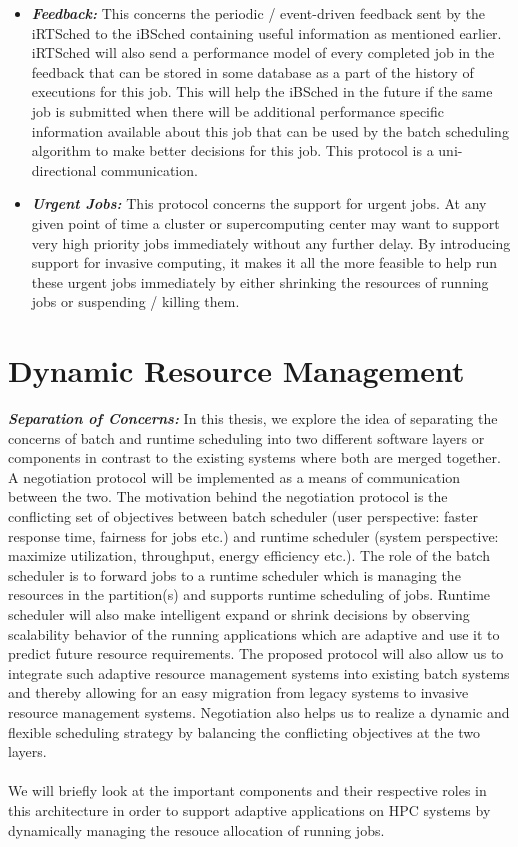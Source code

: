 \begin{itemize}
\item \textbf{\textit{Feedback:}} This concerns the periodic / event-driven feedback sent by the iRTSched to the iBSched containing useful information as mentioned earlier. iRTSched will also send a performance model of every completed job in the feedback that can be stored in some database as a part of the history of executions for this job. This will help the iBSched in the future if the same job is submitted when there will be additional performance specific information available about this job that can be used by the batch scheduling algorithm to make better decisions for this job. This protocol is a uni-directional communication.
\item \textbf{\textit{Urgent Jobs:}} This protocol concerns the support for urgent jobs. At any given point of time a cluster or supercomputing center may want to support very high priority jobs immediately without any further delay. By introducing support for invasive computing, it makes it all the more feasible to help run these urgent jobs immediately by either shrinking the resources of running jobs or suspending / killing them.
\end{itemize}
\section{Dynamic Resource Management}
\textbf{\textit{Separation of Concerns: }}In this thesis, we explore the idea of separating the concerns of batch and runtime scheduling into
two different software layers or components in contrast to the existing systems where both are merged together. A negotiation protocol will be implemented as a means of communication between the two. The motivation behind the negotiation protocol is the conflicting set of objectives between batch scheduler (user perspective: faster response time, fairness for jobs etc.) and runtime scheduler (system perspective: maximize utilization, throughput, energy efficiency etc.). The role of the batch scheduler is to forward jobs to a runtime scheduler which is managing the resources in the partition(s) and supports runtime scheduling of jobs. Runtime scheduler will also make intelligent expand or shrink decisions by observing scalability behavior of the running applications which are adaptive and use it to predict future resource requirements. The proposed protocol will also allow us to integrate such adaptive resource management systems into existing batch systems and thereby allowing for an easy migration from legacy systems to invasive resource management systems. Negotiation also helps us to realize a dynamic and flexible scheduling strategy by balancing the conflicting objectives at the two layers.\\ \\
We will briefly look at the important components and their respective roles in this architecture in order to support adaptive applications on HPC systems by dynamically managing the resouce allocation of running jobs. 
